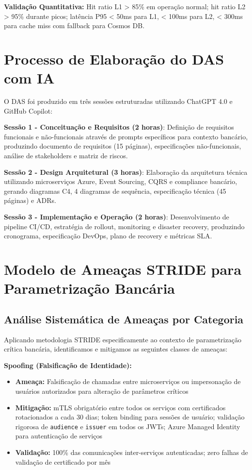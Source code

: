\textbf{Validação Quantitativa:} Hit ratio L1 > 85\% em operação normal; hit ratio L2 > 95\% durante picos; latência P95 < 50ms para L1, < 100ms para L2, < 300ms para cache miss com fallback para Cosmos DB.

\section{Processo de Elaboração do DAS com IA}

O DAS foi produzido em três sessões estruturadas utilizando ChatGPT 4.0 e GitHub Copilot:

\textbf{Sessão 1 - Conceituação e Requisitos (2 horas)}: Definição de requisitos funcionais e não-funcionais através de prompts específicos para contexto bancário, produzindo documento de requisitos (15 páginas), especificações não-funcionais, análise de stakeholders e matriz de riscos.

\textbf{Sessão 2 - Design Arquitetural (3 horas)}: Elaboração da arquitetura técnica utilizando microserviços Azure, Event Sourcing, CQRS e compliance bancário, gerando diagramas C4, 4 diagramas de sequência, especificação técnica (45 páginas) e ADRs.

\textbf{Sessão 3 - Implementação e Operação (2 horas)}: Desenvolvimento de pipeline CI/CD, estratégia de rollout, monitoring e disaster recovery, produzindo cronograma, especificação DevOps, plano de recovery e métricas SLA.

\section{Modelo de Ameaças STRIDE para Parametrização Bancária}

\subsection{Análise Sistemática de Ameaças por Categoria}

Aplicando metodologia STRIDE especificamente ao contexto de parametrização crítica bancária, identificamos e mitigamos as seguintes classes de ameaças:

\textbf{Spoofing (Falsificação de Identidade):}
\begin{itemize}
\item \textbf{Ameaça:} Falsificação de chamadas entre microserviços ou impersonação de usuários autorizados para alteração de parâmetros críticos
\item \textbf{Mitigação:} mTLS obrigatório entre todos os serviços com certificados rotacionados a cada 30 dias; token binding para sessões de usuário; validação rigorosa de \texttt{audience} e \texttt{issuer} em todos os JWTs; Azure Managed Identity para autenticação de serviços
\item \textbf{Validação:} 100\% das comunicações inter-serviços autenticadas; zero falhas de validação de certificado por mês
\end{itemize}

